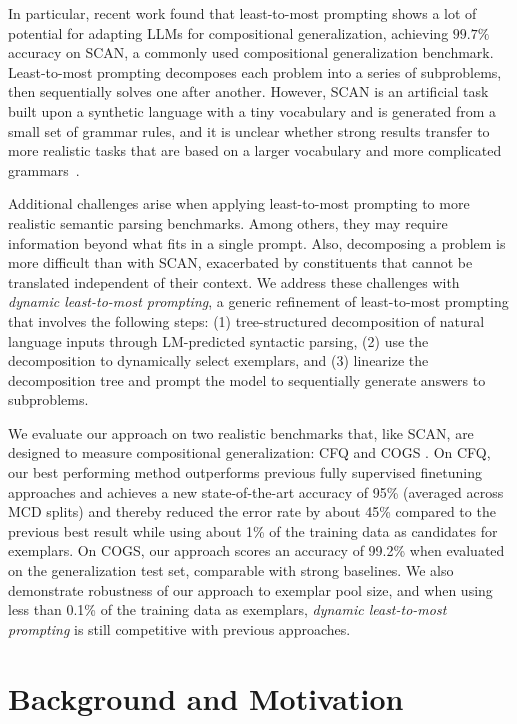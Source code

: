 \documentclass{article} \usepackage{iclr2022_conference,times}
\begin{document}
In particular, recent work \citep{zhou2022leasttomost} found that least-to-most prompting shows a lot of potential for adapting LLMs for compositional generalization, achieving $99.7\%$ accuracy on SCAN, a commonly used compositional generalization benchmark. Least-to-most prompting decomposes each problem into a series of subproblems, then sequentially solves one after another. However, SCAN is an artificial task built upon a synthetic language with a tiny vocabulary and is generated from a small set of grammar rules, and it is unclear whether strong results transfer to more realistic tasks that are based on a larger vocabulary and more complicated grammars~\citep{Furrer2020CompositionalGI}.

Additional challenges arise when applying least-to-most prompting to more realistic semantic parsing benchmarks. Among others, they may require information beyond what fits in a single prompt. Also, decomposing a problem is more difficult than with SCAN, exacerbated by constituents that cannot be translated independent of their context.
We address these challenges with \textit{dynamic least-to-most prompting}, a generic refinement of least-to-most prompting that involves the following steps: (1) tree-structured decomposition of natural language inputs through LM-predicted syntactic parsing, (2) use the decomposition to dynamically select exemplars, and (3) linearize the decomposition tree and prompt the model to sequentially generate answers to subproblems. 


We evaluate our approach on two realistic benchmarks that, like SCAN, are designed to measure compositional generalization: CFQ \citep{Keysers2020MeasuringCG} and COGS \citep{kim-linzen-2020-cogs}. On CFQ, our best performing method outperforms previous fully supervised finetuning approaches and achieves a new state-of-the-art accuracy of 95\% (averaged across MCD splits) and thereby reduced the error rate by about 45\% compared to the previous best result while using about 1\% of the training data as candidates for exemplars. On COGS, our approach scores an accuracy of 99.2\% when evaluated on the generalization test set, comparable with strong baselines. We also demonstrate robustness of our approach to exemplar pool size, and when using less than 0.1\% of the training data as exemplars, \textit{dynamic least-to-most prompting} is still competitive with previous approaches.

\section{Background and Motivation \label{sec:background}}
\end{document}
